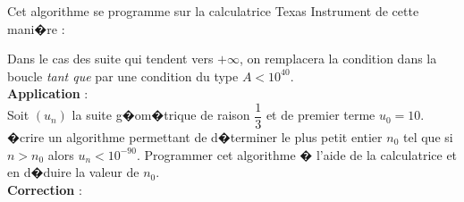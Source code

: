 \documentclass[a4paper,12pt,twoside,french]{extarticle}
\begin{document}
\noindent Cet algorithme se programme sur la calculatrice Texas Instrument de cette mani�re :


\noindent Dans le cas des suite qui tendent vers $+\infty$, on remplacera la condition dans la boucle \emph{tant que} par une condition du type $A<10^{40}$.\\ 

\noindent \textbf{Application} : \\

\noindent Soit $(u_n)$ la suite g�om�trique de raison $\dfrac{1}{3}$ et de premier terme $u_0=10$.\\
\noindent �crire un algorithme permettant de d�terminer le plus petit entier $n_0$ tel que si $n > n_0$ alors $u_n < 10^{-90}$. Programmer cet algorithme � l'aide de la calculatrice et en d�duire la valeur de $n_0$.\\


\noindent \textbf{Correction} :\\
\end{document}
